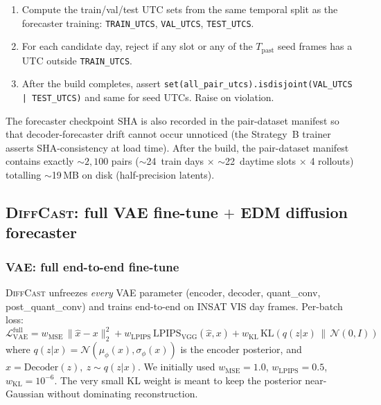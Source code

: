 \documentclass[11pt,a4paper]{article}
\begin{document}
\begin{enumerate}[leftmargin=*,itemsep=2pt]
\item Compute the train/val/test UTC sets from the same temporal split as
      the forecaster training: \texttt{TRAIN\_UTCS}, \texttt{VAL\_UTCS},
      \texttt{TEST\_UTCS}.
\item For each candidate day, reject if any slot or any of the $T_{\text{past}}$
      seed frames has a UTC outside \texttt{TRAIN\_UTCS}.
\item After the build completes, assert
      \texttt{set(all\_pair\_utcs).isdisjoint(VAL\_UTCS | TEST\_UTCS)} and
      same for seed UTCs. Raise on violation.
\end{enumerate}

The forecaster checkpoint SHA is also recorded in the pair-dataset
manifest so that decoder-forecaster drift cannot occur unnoticed (the
Strategy~B trainer asserts SHA-consistency at load time). After the
build, the pair-dataset manifest contains exactly $\sim 2{,}100$ pairs
($\sim$24~train days $\times$ $\sim$22~daytime slots $\times$ 4 rollouts)
totalling $\sim$19\,MB on disk (half-precision latents).

\subsection{\textsc{DiffCast}: full {VAE} fine-tune $+$ EDM diffusion forecaster}
\label{sec:diffcast}

\subsubsection{VAE: full end-to-end fine-tune}
\label{sec:diffcast-vae}
\textsc{DiffCast} unfreezes \emph{every} {VAE} parameter (encoder, decoder,
quant\_conv, post\_quant\_conv) and trains end-to-end on INSAT VIS day
frames. Per-batch loss:
\begin{equation}
\mathcal{L}_{\text{VAE}}^{\text{full}}
   = w_{\mathrm{MSE}}\,\|\hat x - x\|_2^2
   + w_{\mathrm{LPIPS}}\,\mathrm{LPIPS}_{\text{VGG}}(\hat x, x)
   + w_{\mathrm{KL}}\,\mathrm{KL}(q(z|x)\,\|\,\mathcal{N}(0, I))
\label{eq:loss-vae-full}
\end{equation}
where $q(z|x) = \mathcal{N}(\mu_\phi(x), \sigma_\phi(x))$ is the encoder
posterior, and $\hat x = \mathrm{Decoder}(z),\ z\sim q(z|x)$. We initially
used $w_{\mathrm{MSE}}=1.0$, $w_{\mathrm{LPIPS}}=0.5$,
$w_{\mathrm{KL}}=10^{-6}$. The very small KL weight is meant to keep the
posterior near-Gaussian without dominating reconstruction.
\end{document}

